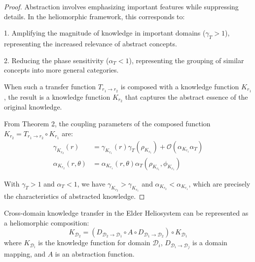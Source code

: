 \begin{proof}
Abstraction involves emphasizing important features while suppressing details. In the heliomorphic framework, this corresponds to:

1. Amplifying the magnitude of knowledge in important domains ($\gamma_T > 1$), representing the increased relevance of abstract concepts.

2. Reducing the phase sensitivity ($\alpha_T < 1$), representing the grouping of similar concepts into more general categories.

When such a transfer function $T_{r_1 \to r_2}$ is composed with a knowledge function $K_{r_1}$, the result is a knowledge function $K_{r_2}$ that captures the abstract essence of the original knowledge.

From Theorem 2, the coupling parameters of the composed function $K_{r_2} = T_{r_1 \to r_2} \circ K_{r_1}$ are:
\begin{align}
\gamma_{K_{r_2}}(r) &= \gamma_{K_{r_1}}(r)\gamma_T(\rho_{K_{r_1}}) + \mathcal{O}(\alpha_{K_{r_1}}\alpha_T)\\
\alpha_{K_{r_2}}(r,\theta) &= \alpha_{K_{r_1}}(r,\theta)\alpha_T(\rho_{K_{r_1}},\phi_{K_{r_1}})
\end{align}

With $\gamma_T > 1$ and $\alpha_T < 1$, we have $\gamma_{K_{r_2}} > \gamma_{K_{r_1}}$ and $\alpha_{K_{r_2}} < \alpha_{K_{r_1}}$, which are precisely the characteristics of abstracted knowledge.
\end{proof}

\begin{theorem}
Cross-domain knowledge transfer in the Elder Heliosystem can be represented as a heliomorphic composition:
\begin{equation}
K_{\mathcal{D}_2} = (D_{\mathcal{D}_2 \to \mathcal{D}_1} \circ A \circ D_{\mathcal{D}_1 \to \mathcal{D}_2}) \circ K_{\mathcal{D}_1}
\end{equation}
where $K_{\mathcal{D}_i}$ is the knowledge function for domain $\mathcal{D}_i$, $D_{\mathcal{D}_i \to \mathcal{D}_j}$ is a domain mapping, and $A$ is an abstraction function.
\end{theorem}


